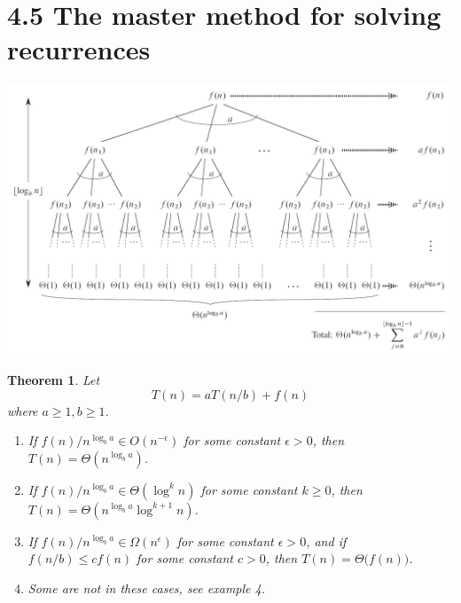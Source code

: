 \documentclass[a4paper]{article}
\theoremstyle{plain}
\newtheorem*{theorem*}{Theorem}
\begin{document}
\section*{4.5 The master method for solving recurrences}
\includegraphics[scale=0.4]{"Master-Theorem"}
\begin{theorem*}
Let
\begin{equation*}
    T(n) = aT(n/b) + f(n)
\end{equation*}
where $a\geq 1,b\geq 1$.
\begin{enumerate}
    \item If $f(n)/{n^{\log_b{a}}}\in O(n^{-\epsilon})$ for some constant $\epsilon>0$, then $T(n)=\Theta(n^{\log_b{a}})$.
    \item If $f(n)/{n^{\log_b{a}}}\in \Theta({\log^k{n}})$ for some constant $k\geq 0$, then $T(n)=\Theta(n^{\log_b{a}} {\log^{k+1}{n}})$.
    \item If $f(n)/{n^{\log_b{a}}}\in \Omega(n^{\epsilon})$ for some constant $\epsilon>0$, and if $f(n/b)\leq cf(n)$ for some constant $c>0$, then $T(n)=\Theta\bigl(f(n)\bigr)$.
    \item Some are not  in these cases, see example 4.
\end{enumerate}
\end{theorem*}
\end{document}
